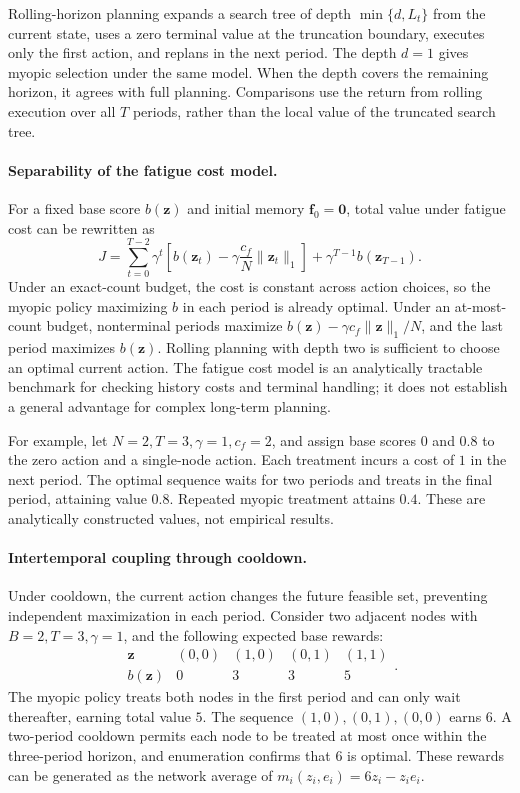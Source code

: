 \documentclass[a4paper,11pt]{article}
\numberwithin{equation}{section}
\begin{document}
Rolling-horizon planning expands a search tree of depth $\min\{d,L_t\}$ from the current state, uses a zero terminal value at the truncation boundary, executes only the first action, and replans in the next period. The depth $d=1$ gives myopic selection under the same model. When the depth covers the remaining horizon, it agrees with full planning. Comparisons use the return from rolling execution over all $T$ periods, rather than the local value of the truncated search tree.

\paragraph{Separability of the fatigue cost model.}
For a fixed base score $b(\mathbf z)$ and initial memory $\mathbf f_0=\mathbf0$, total value under fatigue cost can be rewritten as
\begin{equation}
J=\sum_{t=0}^{T-2}\gamma^t
\left[b(\mathbf z_t)-\gamma\frac{c_f}{N}\|\mathbf z_t\|_1\right]
+\gamma^{T-1}b(\mathbf z_{T-1}).
\label{eq:fatigue-cost-separable}
\end{equation}
Under an exact-count budget, the cost is constant across action choices, so the myopic policy maximizing $b$ in each period is already optimal. Under an at-most-count budget, nonterminal periods maximize $b(\mathbf z)-\gamma c_f\|\mathbf z\|_1/N$, and the last period maximizes $b(\mathbf z)$. Rolling planning with depth two is sufficient to choose an optimal current action. The fatigue cost model is an analytically tractable benchmark for checking history costs and terminal handling; it does not establish a general advantage for complex long-term planning.

For example, let $N=2,T=3,\gamma=1,c_f=2$, and assign base scores $0$ and $0.8$ to the zero action and a single-node action. Each treatment incurs a cost of $1$ in the next period. The optimal sequence waits for two periods and treats in the final period, attaining value $0.8$. Repeated myopic treatment attains $0.4$. These are analytically constructed values, not empirical results.

\paragraph{Intertemporal coupling through cooldown.}
Under cooldown, the current action changes the future feasible set, preventing independent maximization in each period. Consider two adjacent nodes with $B=2,T=3,\gamma=1$, and the following expected base rewards:
\begin{equation}
\begin{array}{c|cccc}
\mathbf z&(0,0)&(1,0)&(0,1)&(1,1)\\\hline
b(\mathbf z)&0&3&3&5
\end{array}.
\label{eq:cooldown-example}
\end{equation}
The myopic policy treats both nodes in the first period and can only wait thereafter, earning total value $5$. The sequence $(1,0),(0,1),(0,0)$ earns $6$. A two-period cooldown permits each node to be treated at most once within the three-period horizon, and enumeration confirms that $6$ is optimal. These rewards can be generated as the network average of $m_i(z_i,e_i)=6z_i-z_ie_i$.
\end{document}
